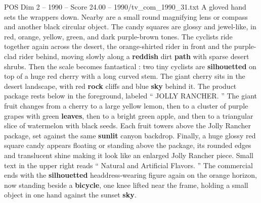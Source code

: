 \begin{textsample}{POS Dim 2 – 1990 – Score 24.00 – 1990/tv\_com\_1990\_31.txt}
A gloved hand sets the wrappers down.
Nearby are a small round magnifying lens or compass and another black circular object.
The candy squares are glossy and jewel-like, in red, orange, yellow, green, and dark purple-brown tones.
The cyclists ride together again across the desert, the orange-shirted rider in front and the purple-clad rider behind, moving slowly along a \textbf{reddish} dirt \textbf{path} with sparse desert shrubs.
Then the scale becomes fantastical : two tiny cyclists are \textbf{silhouetted} on top of a huge red cherry with a long curved stem.
The giant cherry sits in the desert landscape, with red \textbf{rock} cliffs and blue \textbf{sky} behind it.
The product package rests below in the foreground, labeled “ JOLLY RANCHER. ” The giant fruit changes from a cherry to a large yellow lemon, then to a cluster of purple grapes with green \textbf{leaves}, then to a bright green apple, and then to a triangular slice of watermelon with black seeds.
Each fruit towers above the Jolly Rancher package, set against the same \textbf{sunlit} canyon backdrop.
Finally, a huge glossy red square candy appears floating or standing above the package, its rounded edges and translucent shine making it look like an enlarged Jolly Rancher piece.
Small text in the upper right reads “ Natural and Artificial Flavors. ” The commercial ends with the \textbf{silhouetted} headdress-wearing figure again on the orange horizon, now standing beside a \textbf{bicycle}, one knee lifted near the frame, holding a small object in one hand against the sunset \textbf{sky}.

\end{textsample}
